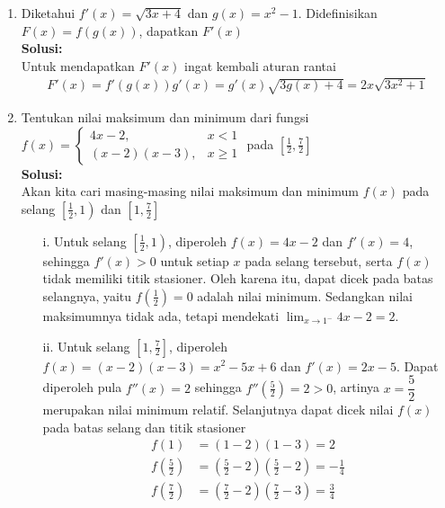 \documentclass{article}
\begin{document}
\begin{enumerate}
\begin{enumerate}
\begin{enumerate}
\begin{align*}
			x+y-1 &= 0
			\end{align*}
		\end{enumerate}
		Jadi terdapat dua titik $(x_0,y_0)$ pada kurva $f(x)$ yang garis singgungnya tegak lurus dengan garis $y=x$, yaitu titik $(-3,0)$ dengan garis singgung $x+y+3=0$ dan titik $(-1,2)$ dengan garis singgung $x+y-1=0$
	\end{enumerate}
	\newpage 
	\item Diketahui $f'(x)=\sqrt{3x+4}$ dan $g(x)=x^2-1$. Didefinisikan $F(x)=f(g(x))$, dapatkan $F'(x)$\\
	\textbf{Solusi:}\\
	Untuk mendapatkan $F'(x)$ ingat kembali aturan rantai
	\begin{align*}
	F'(x) =f'(g(x))g'(x) = g'(x)\sqrt{3g(x)+4} = 2x\sqrt{3x^2+1}
	\end{align*}
	\item Tentukan nilai maksimum dan minimum dari fungsi $f(x)=\begin{cases} 4x-2, &x<1 \\
	(x-2)(x-3), &x\geq 1\end{cases}$ pada $\left[\frac{1}{2},\frac{7}{2}\right]$
	\\[0.1 cm] \textbf{Solusi:}\\
	Akan kita cari masing-masing nilai maksimum dan minimum $f(x)$ pada selang $\left[\frac{1}{2},1\right)$ dan $\left[1,\frac{7}{2}\right]$
	\begin{enumerate}
		\item[i.] Untuk selang $\left[\frac{1}{2},1\right)$, diperoleh $f(x)=4x-2$ dan $f'(x)=4$, sehingga $f'(x)>0$ untuk setiap $x$ pada selang tersebut, serta $f(x)$ tidak memiliki titik stasioner. Oleh karena itu, dapat dicek pada batas selangnya, yaitu $f\left(\frac{1}{2}\right)=0$ adalah nilai minimum. Sedangkan nilai maksimumnya tidak ada, tetapi mendekati $\displaystyle \lim_{x\rightarrow 1^-} 4x-2 = 2$.
		\item[ii.] Untuk selang $\left[1,\frac{7}{2}\right]$, diperoleh $f(x)=(x-2)(x-3)=x^2-5x+6$ dan $f'(x)=2x-5$. Dapat diperoleh pula $f''(x)=2$ sehingga $f''\left(\frac{5}{2}\right)=2>0$, artinya $x=\dfrac{5}{2}$ merupakan nilai minimum relatif. Selanjutnya dapat dicek nilai $f(x)$ pada batas selang dan titik stasioner 
		\begin{align*}
		f(1)&=(1-2)(1-3)=2 \\
		f\left(\frac{5}{2}\right) &=\left(\frac{5}{2}-2\right)\left(\frac{5}{2}-2\right) = -\frac{1}{4} \\
		f\left(\frac{7}{2}\right) &= \left(\frac{7}{2}-2\right)\left(\frac{7}{2}-3\right) = \frac{3}{4}

\end{align*}
\end{enumerate}
\end{enumerate}
\end{document}

